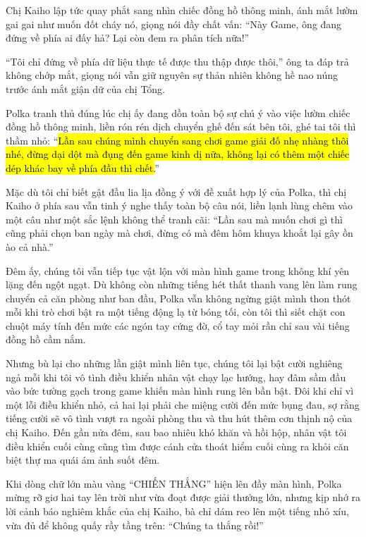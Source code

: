 \documentclass[../main.tex]{subfiles}
\begin{document}
Chị Kaiho lập tức quay phắt sang nhìn chiếc đồng hồ thông minh, ánh mắt lườm gai gai như muốn đốt cháy nó, giọng nói đầy chất vấn: ``Này Game, ông đang đứng về phía ai đấy hả? Lại còn đem ra phân tích nữa!''

``Tôi chỉ đứng về phía dữ liệu thực tế được thu thập được thôi,'' ông ta đáp trả không chớp mắt, giọng nói vẫn giữ nguyên sự thản nhiên không hề nao núng trước ánh mắt giận dữ của chị Tổng.

Polka tranh thủ đúng lúc chị ấy đang dồn toàn bộ sự chú ý vào việc lườm chiếc đồng hồ thông minh, liền rón rén dịch chuyển ghế đến sát bên tôi, ghé tai tôi thì thầm nhỏ: ``\hl{Lần sau chúng mình chuyển sang chơi game giải đố nhẹ nhàng thôi nhé, đừng dại dột mà đụng đến game kinh dị nữa, không lại có thêm một chiếc dép khác bay về phía đầu thì chết.}''

Mặc dù tôi chỉ biết gật đầu lia lịa đồng ý với đề xuất hợp lý của Polka, thì chị Kaiho ở phía sau vẫn tinh ý nghe thấy toàn bộ câu nói, liền lạnh lùng chêm vào một câu như một sắc lệnh không thể tranh cãi: ``Lần sau mà muốn chơi gì thì cũng phải chọn ban ngày mà chơi, đừng có mà đêm hôm khuya khoắt lại gây ồn ào cả nhà.''

\ct

Đêm ấy, chúng tôi vẫn tiếp tục vật lộn với màn hình game trong không khí yên lặng đến ngột ngạt. Dù không còn những tiếng hét thất thanh vang lên làm rung chuyển cả căn phòng như ban đầu, Polka vẫn không ngừng giật mình thon thót mỗi khi trò chơi bật ra một tiếng động lạ từ bóng tối, còn tôi thì siết chặt con chuột máy tính đến mức các ngón tay cứng đờ, cổ tay mỏi rần chỉ sau vài tiếng đồng hồ cầm nắm.

Nhưng bù lại cho những lần giật mình liên tục, chúng tôi lại bật cười nghiêng ngả mỗi khi tôi vô tình điều khiển nhân vật chạy lạc hướng, hay đâm sầm đầu vào bức tường gạch trong game khiến màn hình rung lên bần bật. Đôi khi chỉ vì một lỗi điều khiển nhỏ, cả hai lại phải che miệng cười đến mức bụng đau, sợ rằng tiếng cười sẽ vô tình vượt ra ngoài phòng thu và thu hút thêm cơn thịnh nộ của chị Kaiho. Đến gần nửa đêm, sau bao nhiêu khó khăn và hồi hộp, nhân vật tôi điều khiển cuối cùng cũng tìm được cánh cửa thoát hiểm cuối cùng ra khỏi căn biệt thự ma quái ám ảnh suốt đêm.

Khi dòng chữ lớn màu vàng ``CHIẾN THẮNG'' hiện lên đầy màn hình, Polka mừng rỡ giơ hai tay lên trời như vừa đoạt được giải thưởng lớn, nhưng kịp nhớ ra lời cảnh báo nghiêm khắc của chị Kaiho, bà chỉ dám reo lên một tiếng nhỏ xíu, vừa đủ để không quấy rầy tầng trên: ``Chúng ta thắng rồi!''
\end{document}

